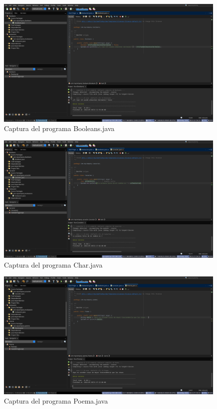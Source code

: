 \documentclass{article}
\begin{document}
\newpage

\begin{landscape}
    \begin{figure}[h]
        \centering
        \includegraphics[width=\linewidth]{img/booleans.png}
        \caption{Captura del programa Booleans.java}
        \label{fig:captura}
    \end{figure}

    \newpage

    \begin{figure}[h]
        \centering
        \includegraphics[width=\linewidth]{img/character.png}
        \caption{Captura del programa Char.java}
        \label{fig:captura}
    \end{figure}

    \newpage

    \begin{figure}[h]
        \centering
        \includegraphics[width=\linewidth]{img/poema.png}
        \caption{Captura del programa Poema.java}
        \label{fig:captura}
    \end{figure}


\end{landscape}
\end{document}

